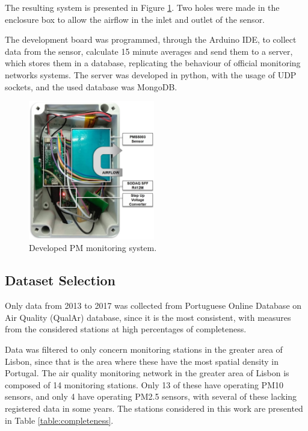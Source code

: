 The resulting system is presented in Figure \ref{fig:ieec5}. Two holes were made in the enclosure box to allow the airflow in the inlet and outlet of the sensor.

The development board was programmed, through the Arduino IDE, to collect data from the sensor, calculate 15 minute averages and send them to a server, which stores them in a database, replicating the behaviour of official monitoring networks systems. The server was developed in python, with the usage of UDP sockets, and the used database was MongoDB. 

\begin{figure}[ht]
\centering
\includegraphics[width=0.49\textwidth]{./Images/circuit-final.jpg}
\caption{Developed PM monitoring system.}
\label{fig:ieec5}
\end{figure}

\subsection{Dataset Selection}

Only data from 2013 to 2017 was collected from Portuguese Online Database on Air Quality (QualAr) database, since it is the most consistent, with measures from the considered stations at high percentages of completeness.

Data was filtered to only concern monitoring stations in the greater area of Lisbon, since that is the area where these have the most spatial density in Portugal. The air quality monitoring network in the greater area of Lisbon is composed of 14 monitoring stations. Only 13 of these have operating PM10 sensors, and only 4 have operating PM2.5 sensors, with several of these lacking registered data in some years. The stations considered in this work are presented in Table \ref{table:completeness}.

